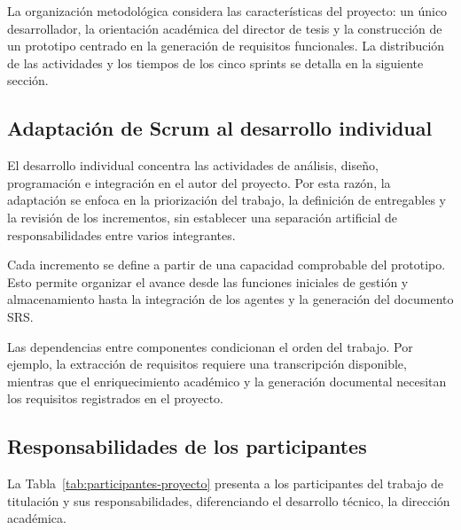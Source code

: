 La organización metodológica considera las características
del proyecto: un único desarrollador, la orientación
académica del director de tesis y la construcción de un
prototipo centrado en la generación de requisitos funcionales.
La distribución de las actividades y los tiempos de los
cinco sprints se detalla en la siguiente sección.

\subsection{Adaptación de Scrum al desarrollo individual}
El desarrollo individual concentra las actividades de
análisis, diseño, programación e integración en el autor
del proyecto. Por esta razón, la adaptación se enfoca en
la priorización del trabajo, la definición de entregables
y la revisión de los incrementos, sin establecer una
separación artificial de responsabilidades entre varios
integrantes.

Cada incremento se define a partir de una capacidad
comprobable del prototipo. Esto permite organizar el avance
desde las funciones iniciales de gestión y almacenamiento
hasta la integración de los agentes y la generación del
documento SRS.

Las dependencias entre componentes condicionan el orden
del trabajo. Por ejemplo, la extracción de requisitos
requiere una transcripción disponible, mientras que
el enriquecimiento académico y la generación documental
necesitan los requisitos registrados en el proyecto.

\subsection{Responsabilidades de los participantes}

La Tabla~\ref{tab:participantes-proyecto} presenta a los
participantes del trabajo de titulación y sus
responsabilidades, diferenciando el desarrollo técnico,
la dirección académica.

